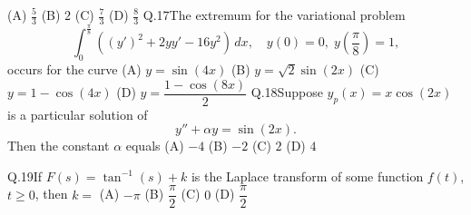 \documentclass{article}
\begin{document}
																										\noindent (A) $\tfrac{5}{3}$ \hspace{2cm} (B) $2$ \hspace{2cm}(C) $\tfrac{7}{3}$ \hspace{2cm} (D) $\tfrac{8}{3}$
																										\vspace{1em}
																										\newline
																										Q.17\quad The extremum for the variational problem
																										\[
																										\int_0^{\frac{\pi}{8}} ((y')^2 + 2yy' - 16y^2) \, dx, \quad y(0) = 0, \; y\left(\frac{\pi}{8}\right) = 1,
																										\]
																										occurs for the curve
																										\newline
																										\noindent (A) $y = \sin(4x)$ \hspace{6cm} (B)  $y = \sqrt{2} \sin(2x)$
																										\newline \noindent (C) $y = 1 - \cos(4x)$ \hspace{5.5cm}  (D) $y = \dfrac{1 - \cos(8x)}{2}$
																										\vspace{1em}
																										\newline
																										Q.18\quad Suppose $y_p(x) = x \cos(2x)$ is a particular solution of 
																										\[
																										y'' + \alpha y = \sin(2x).
																										\]
																										Then the constant $\alpha$ equals
																										\vspace{1em}
																										\newline 
																										\noindent (A) $-4$ \hspace{2cm} (B) $-2$ \hspace{2cm}(C) $2$ \hspace{2cm} (D) $4$

																										\vspace{1em}
																										Q.19\quad If $F(s) = \tan^{-1}(s) + k$ is the Laplace transform of some function $f(t)$, $t \ge 0$, then $k =$
																										\vspace{1em}
																										\newline 
																										\noindent (A) $-\pi$ \hspace{2cm} (B) $\dfrac{\pi}{2}$ \hspace{2cm}(C) $0$ \hspace{2cm} (D) $\dfrac{\pi}{2}$
\end{document}
